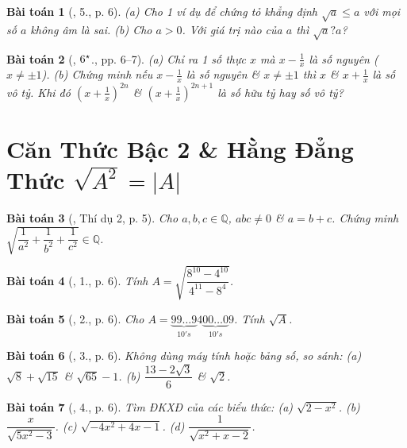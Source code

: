 \documentclass{article}
\newtheorem{baitoan}{Bài toán}
\begin{document}
\begin{baitoan}[\cite{Binh_Toan_9_tap_1}, 5., p. 6]
	(a) Cho 1 ví dụ để chứng tỏ khẳng định $\sqrt{a}\le a$ với mọi số $a$ không âm là sai. (b) Cho $a > 0$. Với giá trị nào của $a$ thì $\sqrt{a} ? a$?
\end{baitoan}

\begin{baitoan}[\cite{Binh_Toan_9_tap_1}, $\rm6^\star$., pp. 6--7]
	(a) Chỉ ra 1 số thực $x$ mà $x - \frac{1}{x}$ là số nguyên ($x\ne\pm1$). (b) Chứng minh nếu $x - \frac{1}{x}$ là số nguyên \& $x\ne\pm1$ thì $x$ \& $x + \frac{1}{x}$ là số vô tỷ. Khi đó $\left(x + \frac{1}{x}\right)^{2n}$ \& $\left(x + \frac{1}{x}\right)^{2n+1}$ là số hữu tỷ hay số vô tỷ?
\end{baitoan}


\section{Căn Thức Bậc 2 \& Hằng Đẳng Thức $\sqrt{A^2} = |A|$}

\begin{baitoan}[\cite{Tuyen_Toan_9}, Thí dụ 2, p. 5]
	Cho $a,b,c\in\mathbb{Q}$, $abc\ne0$ \& $a = b + c$. Chứng minh $\sqrt{\dfrac{1}{a^2} + \dfrac{1}{b^2} + \dfrac{1}{c^2}}\in\mathbb{Q}$.
\end{baitoan}

\begin{baitoan}[\cite{Tuyen_Toan_9}, 1., p. 6]
	Tính $A = \sqrt{\dfrac{8^{10} - 4^{10}}{4^{11} - 8^4}}$.
\end{baitoan}

\begin{baitoan}[\cite{Tuyen_Toan_9}, 2., p. 6]
	Cho $A = \underbrace{99\ldots9}_{10's}4\underbrace{00\ldots0}_{10's}9$. Tính $\sqrt{A}$.
\end{baitoan}

\begin{baitoan}[\cite{Tuyen_Toan_9}, 3., p. 6]
	Không dùng máy tính hoặc bảng số, so sánh: (a) $\sqrt{8} + \sqrt{15}$ \& $\sqrt{65} - 1$. (b) $\dfrac{13 - 2\sqrt{3}}{6}$ \& $\sqrt{2}$.
\end{baitoan}

\begin{baitoan}[\cite{Tuyen_Toan_9}, 4., p. 6]
	Tìm ĐKXĐ của các biểu thức: (a) $\sqrt{2 - x^2}$. (b) $\dfrac{x}{\sqrt{5x^2 - 3}}$. (c) $\sqrt{-4x^2 + 4x - 1}$. (d) $\dfrac{1}{\sqrt{x^2 + x - 2}}$.
\end{baitoan}
\end{document}
